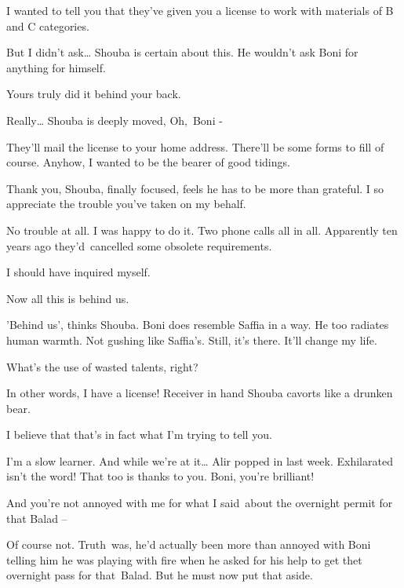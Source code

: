 \documentclass[twoside,11pt]{book}
\begin{document}
{\textquotedbl}I wanted to tell you that they've given you a license to work with materials of B and C
categories.{\textquotedbl} 

{\textquotedbl}But I didn't ask{\dots}{\textquotedbl} Shouba is certain about this. He wouldn't ask Boni for anything
for himself. 

{\textquotedbl}Yours truly did it behind your back.{\textquotedbl} 

{\textquotedbl}Really{\dots}{\textquotedbl} Shouba is deeply moved, {\textquotedbl}Oh,~Boni -{\textquotedbl} 

{\textquotedbl}They'll mail the license to your home address. There'll be some forms to fill of course. Anyhow, I wanted
to be the bearer of good tidings.{\textquotedbl} 

{\textquotedbl}Thank you,{\textquotedbl} Shouba, finally focused, feels he has to be more than grateful.
{\textquotedbl}I so appreciate the trouble you've taken on my behalf.{\textquotedbl} 

{\textquotedbl}No trouble at all. I was happy to do it. Two phone calls all in all. Apparently ten years ago
they{}'d\ cancelled some obsolete requirements.{\textquotedbl} 

{\textquotedbl}I should have inquired myself.{\textquotedbl} 

{\textquotedbl}Now all this is behind us.{\textquotedbl} 

{}'Behind us', thinks Shouba. Boni does resemble Saffia in a way. He too radiates human warmth. Not gushing like
Saffia{}'s. Still, it's there. {\textquotedbl}It'll change my life.{\textquotedbl} 

{\textquotedbl}What's the use of wasted talents, right?{\textquotedbl} 

{\textquotedbl}In other words, I have a license!{\textquotedbl} Receiver in hand Shouba cavorts like a drunken bear. 

{\textquotedbl}I believe that that's in fact what I'm trying to tell you.{\textquotedbl} 

{\textquotedbl}I'm a slow learner. And while we're at it{\dots} Alir popped in last week. Exhilarated isn't the word!
That too is thanks to you. Boni, you're brilliant!{\textquotedbl} 

{\textquotedbl}And you're not annoyed with me for what I said~about the overnight permit for that Balad
--{\textquotedbl} 

{\textquotedbl}Of course not.{\textquotedbl} Truth{\ }was, he'd actually been more than annoyed with Boni
telling him he was playing with fire when he asked for his help to get thet overnight pass for
that{\ }Balad. But he must now put that aside. 
\end{document}
